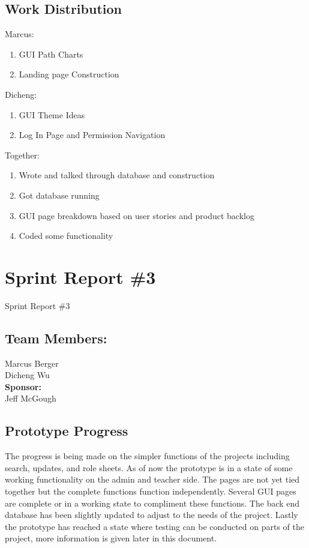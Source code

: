 \subsection{Work Distribution}

Marcus:
\begin{enumerate}
\item GUI Path Charts
\item Landing page Construction\\
\end{enumerate}

Dicheng:
\begin{enumerate}
\item GUI Theme Ideas
\item Log In Page and Permission Navigation\\
\end{enumerate}


Together:
\begin{enumerate}
\item Wrote and talked through database and construction
\item Got database running
\item GUI page breakdown based on user stories and product backlog
\item Coded some functionality
\end{enumerate}


\section{Sprint Report \#3}

Sprint Report \#3


\subsection{Team Members:}
Marcus Berger
\\Dicheng Wu\\
\textbf{Sponsor:}
\\Jeff McGough
\\

\subsection{Prototype Progress}
The progress is being made on the simpler functions of the projects including search, updates, and role sheets. As of now the prototype is in a state of some working functionality on the admin and teacher side. The pages are not yet tied together but the complete functions function independently. Several GUI pages are complete or in a working state to compliment these functions. The back end database has been slightly updated to adjust to the needs of the project. Lastly the prototype has reached a state where testing can be conducted on parts of the project, more information is given later in this document.

